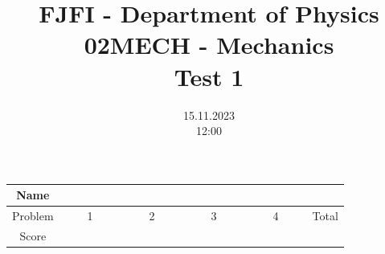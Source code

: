 \documentclass[a4paper,12pt]{article}
\title{{\Large FJFI - Department of Physics} \\ 
               02MECH - Mechanics \\ 
          {\Large \textbf{Test 1}}\vspace{-1cm}}
\date{15.11.2023 \\ 12:00}
\author{}
\begin{document}
\maketitle
\vspace{-1.5em}

\begin{center}
    \renewcommand{\arraystretch}{2}
    \begin{tabular}{ |c|c|c|c|c|c| } 
        \hline
        Name& \multicolumn{5}{c|}{\phantom{~~~~~~~~~~~~~~~~~~~~~~~~~~~~~~~~~~~~~~~~~~~~~~~~~~~~~~~~~~~~~~~~~~~~~~~~~~~~~~~}}\\
        \hline
        Problem & ~~~~1~~~~ & ~~~~2~~~~ & ~~~~3~~~~ & ~~~~4~~~~ & Total \\ 
        \hline
        Score & &  & & & \\
        \hline
    \end{tabular}
\end{center}

\vspace*{1cm}







\end{document}
